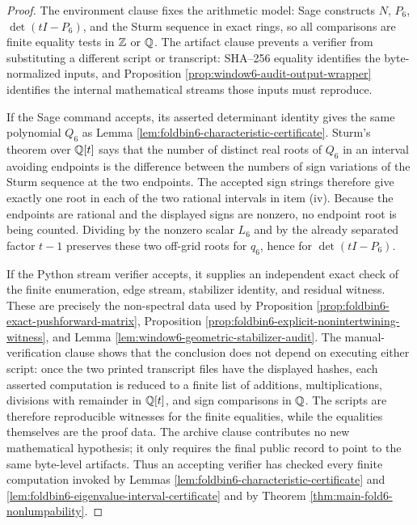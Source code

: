 \begin{proof}
The environment clause fixes the arithmetic model: Sage constructs \(N\), \(P_6\), \(\det(tI-P_6)\), and the Sturm sequence in exact rings, so all comparisons are finite equality tests in \(\mathbb{Z}\) or \(\mathbb{Q}\).  The artifact clause prevents a verifier from substituting a different script or transcript: SHA--256 equality identifies the byte-normalized inputs, and Proposition \ref{prop:window6-audit-output-wrapper} identifies the internal mathematical streams those inputs must reproduce.

If the Sage command accepts, its asserted determinant identity gives the same polynomial \(Q_6\) as Lemma \ref{lem:foldbin6-characteristic-certificate}.  Sturm's theorem over \(\mathbb{Q}[t]\) says that the number of distinct real roots of \(Q_6\) in an interval avoiding endpoints is the difference between the numbers of sign variations of the Sturm sequence at the two endpoints.  The accepted sign strings therefore give exactly one root in each of the two rational intervals in item \textup{(iv)}.  Because the endpoints are rational and the displayed signs are nonzero, no endpoint root is being counted.  Dividing by the nonzero scalar \(L_6\) and by the already separated factor \(t-1\) preserves these two off-grid roots for \(q_6\), hence for \(\det(tI-P_6)\).

If the Python stream verifier accepts, it supplies an independent exact check of the finite enumeration, edge stream, stabilizer identity, and residual witness.  These are precisely the non-spectral data used by Proposition \ref{prop:foldbin6-exact-pushforward-matrix}, Proposition \ref{prop:foldbin6-explicit-nonintertwining-witness}, and Lemma \ref{lem:window6-geometric-stabilizer-audit}.  The manual-verification clause shows that the conclusion does not depend on executing either script: once the two printed transcript files have the displayed hashes, each asserted computation is reduced to a finite list of additions, multiplications, divisions with remainder in \(\mathbb{Q}[t]\), and sign comparisons in \(\mathbb{Q}\).  The scripts are therefore reproducible witnesses for the finite equalities, while the equalities themselves are the proof data.  The archive clause contributes no new mathematical hypothesis; it only requires the final public record to point to the same byte-level artifacts.  Thus an accepting verifier has checked every finite computation invoked by Lemmas \ref{lem:foldbin6-characteristic-certificate} and \ref{lem:foldbin6-eigenvalue-interval-certificate} and by Theorem \ref{thm:main-fold6-nonlumpability}. \qedhere
\end{proof}

\endinput
